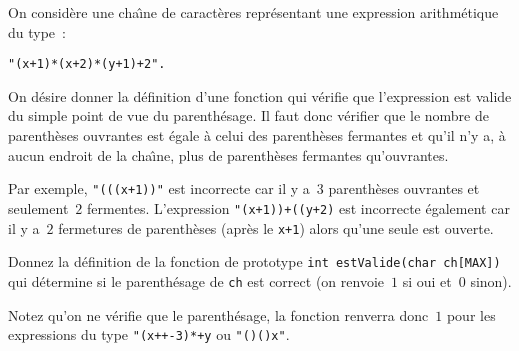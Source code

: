   On consid\`ere   une cha\^\i{}ne de caract\`eres  repr\'esentant une
  expression arithm\'etique du type~:
\begin{verbatim}
"(x+1)*(x+2)*(y+1)+2".
\end{verbatim}
  \par
  On d\'esire donner la d\'efinition d'une fonction qui v\'erifie que l'expression est
  valide du  simple point  de vue  du  parenth\'esage.  Il  faut  donc
  v\'erifier que le nombre  de parenth\`eses ouvrantes est \'egale \`a
  celui des parenth\`eses fermantes et  qu'il n'y a, \`a aucun endroit
  de la cha\^\i{}ne, plus de parenth\`eses fermantes qu'ouvrantes.
  \par
  Par exemple, \texttt{"(((x+1))"} est incorrecte car il y a~$3$
  parenth\`eses ouvrantes et seulement~$2$ fermentes.  L'expression
  \texttt{"(x+1))+((y+2)} est incorrecte \'egalement car il y a~$2$
  fermetures de parenth\`eses (apr\`es le \texttt{x+1}) alors qu'une
  seule est ouverte.
  \par
  Donnez la d\'efinition de la fonction de prototype \texttt{int
    estValide(char ch[MAX])} qui d\'etermine si le parenth\'esage de
  \texttt{ch} est correct (on renvoie~$1$ si oui et~$0$ sinon).
  \par
  Notez qu'on ne v\'erifie que le parenth\'esage, la fonction renverra
  donc~$1$ pour les   expressions   du type  \texttt{"(x++-3)*+y}   ou
  \texttt{"()()x"}.
